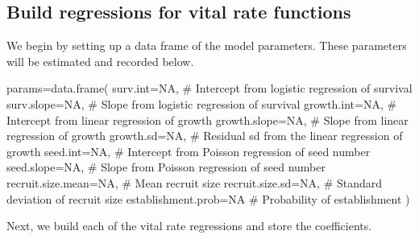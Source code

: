 \documentclass[11pt]{article}
\begin{document}

\subsection{Build regressions for vital rate functions}
\label{sec:Build regressions for vital rate functions}

We begin by setting up a data frame of the model parameters. These parameters will be estimated and recorded below.
\begin{Schunk}
\begin{Sinput}
 params=data.frame(
    surv.int=NA,          # Intercept from logistic regression of survival 
    surv.slope=NA,        # Slope from logistic regression of survival 
    growth.int=NA,        # Intercept from linear regression of growth
    growth.slope=NA,      # Slope from linear regression of growth
    growth.sd=NA,         # Residual sd from the linear regression of growth
    seed.int=NA,          # Intercept from Poisson regression of seed number
    seed.slope=NA,        # Slope from Poisson regression of seed number
    recruit.size.mean=NA, # Mean recruit size
    recruit.size.sd=NA,   # Standard deviation of recruit size
    establishment.prob=NA # Probability of establishment
  )
\end{Sinput}
\end{Schunk}
Next, we build each of the vital rate regressions and store the coefficients.
\end{document}
